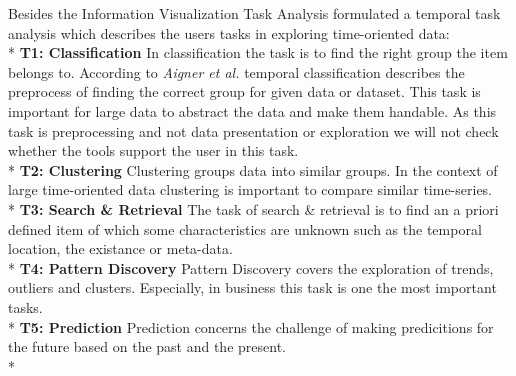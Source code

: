 Besides the Information Visualization Task Analysis \cite{Aigner2011} formulated a temporal task analysis which describes the users tasks in exploring time-oriented data:
\\*
\textbf{T1: Classification}
In classification the task is to find the right group the item belongs to. According to \textit{Aigner et al.} temporal classification describes the preprocess of finding the correct group for given data or dataset. This task is important for large data to abstract the data and make them handable. As this task is preprocessing and not data presentation or exploration we will not check whether the tools support the user in this task.
\\*
\textbf{T2: Clustering}
Clustering groups data into similar groups. In the context of large time-oriented data clustering is important to compare similar time-series.
\\*
\textbf{T3: Search \& Retrieval}
The task of search \& retrieval is to find an a priori defined item of which some characteristics are unknown such as the temporal location, the existance or meta-data.
\\*
\textbf{T4: Pattern Discovery}
Pattern Discovery covers the exploration of trends, outliers and clusters. Especially, in business this task is one the most important tasks.
\\*
\textbf{T5: Prediction}
Prediction concerns the challenge of making predicitions for the future based on the past and the present.
\\*

